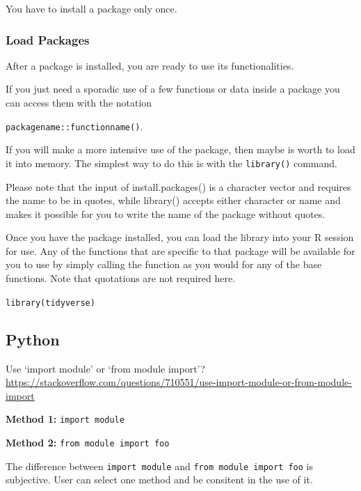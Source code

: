 \documentclass[
]{book}
\begin{document}
You have to install a package only once.

\hypertarget{load-packages}{%
\subsubsection{Load Packages}\label{load-packages}}

After a package is installed, you are ready to use its functionalities.

If you just need a sporadic use of a few functions or data inside a package you can access them with the notation

\texttt{packagename::functionname()}.

If you will make a more intensive use of the package, then maybe is worth to load it into memory. The simplest way to do this is with the \texttt{library()} command.

Please note that the input of install.packages() is a character vector and requires the name to be in quotes, while library() accepts either character or name and makes it possible for you to write the name of the package without quotes.

Once you have the package installed, you can load the library into your R session for use. Any of the functions that are specific to that package will be available for you to use by simply calling the function as you would for any of the base functions. Note that quotations are not required here.

\texttt{library(tidyverse)}

\hypertarget{python-4}{%
\subsection{Python}\label{python-4}}

Use `import module' or `from module import'? \url{https://stackoverflow.com/questions/710551/use-import-module-or-from-module-import}

\textbf{Method 1:} \texttt{import\ module}

\textbf{Method 2:} \texttt{from\ module\ import\ foo}

The difference between \texttt{import\ module} and \texttt{from\ module\ import\ foo} is subjective. User can select one method and be consitent in the use of it.
\end{document}
